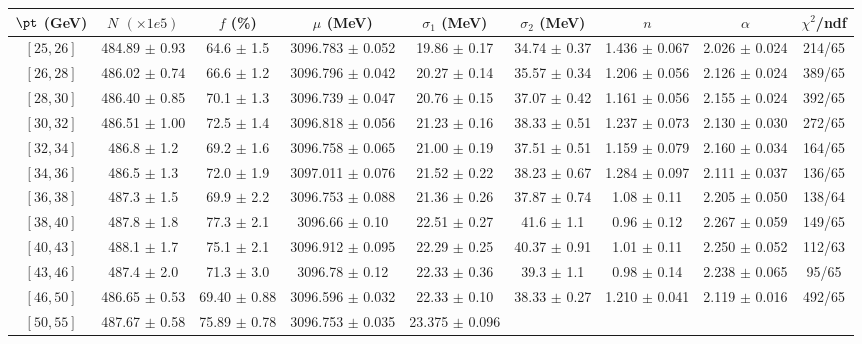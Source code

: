 \begin{tabular}{c||c|c|c|c|c|c|c||c}
$\pt$ (GeV) & $N$ $(\times1e5)$ & $f$ (\%) & $\mu$ (MeV) & $\sigma_1$ (MeV) & $\sigma_2$ (MeV) & $n$ &  $\alpha$ & $\chi^2$/ndf \\
\hline
$[25, 26]$ & 484.89 $\pm$ 0.93 & 
64.6 $\pm$ 1.5 & 
3096.783 $\pm$ 0.052 & 
19.86 $\pm$ 0.17 & 
34.74 $\pm$ 0.37 & 
1.436 $\pm$ 0.067 & 
2.026 $\pm$ 0.024 & 
214/65\\
$[26, 28]$ & 486.02 $\pm$ 0.74 & 
66.6 $\pm$ 1.2 & 
3096.796 $\pm$ 0.042 & 
20.27 $\pm$ 0.14 & 
35.57 $\pm$ 0.34 & 
1.206 $\pm$ 0.056 & 
2.126 $\pm$ 0.024 & 
389/65\\
$[28, 30]$ & 486.40 $\pm$ 0.85 & 
70.1 $\pm$ 1.3 & 
3096.739 $\pm$ 0.047 & 
20.76 $\pm$ 0.15 & 
37.07 $\pm$ 0.42 & 
1.161 $\pm$ 0.056 & 
2.155 $\pm$ 0.024 & 
392/65\\
$[30, 32]$ & 486.51 $\pm$ 1.00 & 
72.5 $\pm$ 1.4 & 
3096.818 $\pm$ 0.056 & 
21.23 $\pm$ 0.16 & 
38.33 $\pm$ 0.51 & 
1.237 $\pm$ 0.073 & 
2.130 $\pm$ 0.030 & 
272/65\\
$[32, 34]$ & 486.8 $\pm$ 1.2 & 
69.2 $\pm$ 1.6 & 
3096.758 $\pm$ 0.065 & 
21.00 $\pm$ 0.19 & 
37.51 $\pm$ 0.51 & 
1.159 $\pm$ 0.079 & 
2.160 $\pm$ 0.034 & 
164/65\\
$[34, 36]$ & 486.5 $\pm$ 1.3 & 
72.0 $\pm$ 1.9 & 
3097.011 $\pm$ 0.076 & 
21.52 $\pm$ 0.22 & 
38.23 $\pm$ 0.67 & 
1.284 $\pm$ 0.097 & 
2.111 $\pm$ 0.037 & 
136/65\\
$[36, 38]$ & 487.3 $\pm$ 1.5 & 
69.9 $\pm$ 2.2 & 
3096.753 $\pm$ 0.088 & 
21.36 $\pm$ 0.26 & 
37.87 $\pm$ 0.74 & 
1.08 $\pm$ 0.11 & 
2.205 $\pm$ 0.050 & 
138/64\\
$[38, 40]$ & 487.8 $\pm$ 1.8 & 
77.3 $\pm$ 2.1 & 
3096.66 $\pm$ 0.10 & 
22.51 $\pm$ 0.27 & 
41.6 $\pm$ 1.1 & 
0.96 $\pm$ 0.12 & 
2.267 $\pm$ 0.059 & 
149/65\\
$[40, 43]$ & 488.1 $\pm$ 1.7 & 
75.1 $\pm$ 2.1 & 
3096.912 $\pm$ 0.095 & 
22.29 $\pm$ 0.25 & 
40.37 $\pm$ 0.91 & 
1.01 $\pm$ 0.11 & 
2.250 $\pm$ 0.052 & 
112/63\\
$[43, 46]$ & 487.4 $\pm$ 2.0 & 
71.3 $\pm$ 3.0 & 
3096.78 $\pm$ 0.12 & 
22.33 $\pm$ 0.36 & 
39.3 $\pm$ 1.1 & 
0.98 $\pm$ 0.14 & 
2.238 $\pm$ 0.065 & 
95/65\\
$[46, 50]$ & 486.65 $\pm$ 0.53 & 
69.40 $\pm$ 0.88 & 
3096.596 $\pm$ 0.032 & 
22.33 $\pm$ 0.10 & 
38.33 $\pm$ 0.27 & 
1.210 $\pm$ 0.041 & 
2.119 $\pm$ 0.016 & 
492/65\\
$[50, 55]$ & 487.67 $\pm$ 0.58 & 
75.89 $\pm$ 0.78 & 
3096.753 $\pm$ 0.035 & 
23.375 $\pm$ 0.096 & 

\end{tabular}
